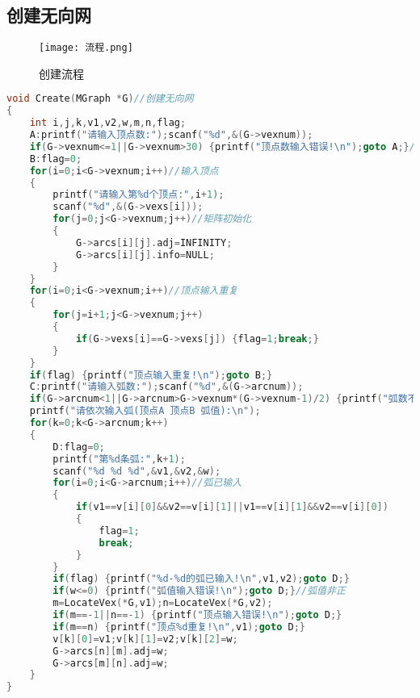 \documentclass{DateStructure}
\begin{document}
\subsection{创建无向网}
\begin{figure}[H] 
\centering
\texttt{[image: 流程.png]}
\caption{创建流程}
\end{figure}
\begin{lstlisting}[language=c,caption={Create}]
void Create(MGraph *G)//创建无向网
{
    int i,j,k,v1,v2,w,m,n,flag;
    A:printf("请输入顶点数:");scanf("%d",&(G->vexnum));
    if(G->vexnum<=1||G->vexnum>30) {printf("顶点数输入错误!\n");goto A;}//顶点个数不合法
    B:flag=0;
    for(i=0;i<G->vexnum;i++)//输入顶点
    {
        printf("请输入第%d个顶点:",i+1);
        scanf("%d",&(G->vexs[i]));
        for(j=0;j<G->vexnum;j++)//矩阵初始化
        {
            G->arcs[i][j].adj=INFINITY;
            G->arcs[i][j].info=NULL;
        }
    }
    for(i=0;i<G->vexnum;i++)//顶点输入重复
    {
        for(j=i+1;j<G->vexnum;j++)
        {
            if(G->vexs[i]==G->vexs[j]) {flag=1;break;}
        }
    }
    if(flag) {printf("顶点输入重复!\n");goto B;}
    C:printf("请输入弧数:");scanf("%d",&(G->arcnum));
    if(G->arcnum<1||G->arcnum>G->vexnum*(G->vexnum-1)/2) {printf("弧数不合法!\n");goto C;}//弧数不合法
    printf("请依次输入弧(顶点A 顶点B 弧值):\n");
    for(k=0;k<G->arcnum;k++)
    {
        D:flag=0;
        printf("第%d条弧:",k+1);
        scanf("%d %d %d",&v1,&v2,&w);
        for(i=0;i<G->arcnum;i++)//弧已输入
        {
            if(v1==v[i][0]&&v2==v[i][1]||v1==v[i][1]&&v2==v[i][0])
            {
                flag=1;
                break;
            }
        }
        if(flag) {printf("%d-%d的弧已输入!\n",v1,v2);goto D;}
        if(w<=0) {printf("弧值输入错误!\n");goto D;}//弧值非正
        m=LocateVex(*G,v1);n=LocateVex(*G,v2);
        if(m==-1||n==-1) {printf("顶点输入错误!\n");goto D;}
        if(m==n) {printf("顶点%d重复!\n",v1);goto D;}
        v[k][0]=v1;v[k][1]=v2;v[k][2]=w;
        G->arcs[n][m].adj=w;
        G->arcs[m][n].adj=w;
    }
}
\end{lstlisting}
\end{document}
